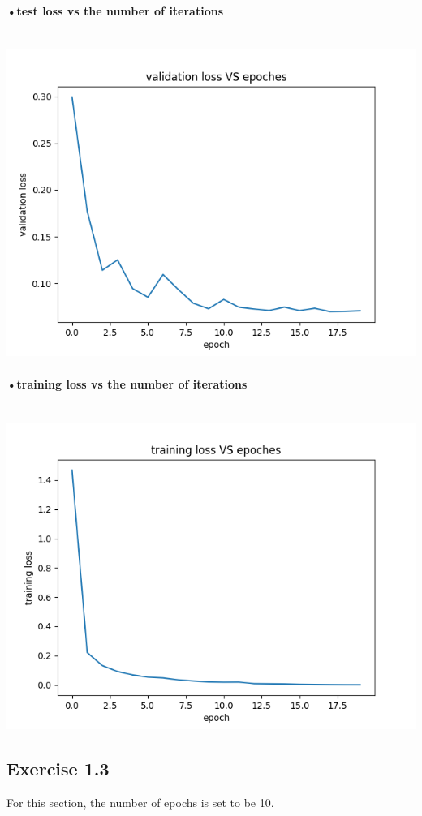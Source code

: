 \documentclass[11pt]{article} %
\begin{document}
\paragraph{•test loss vs the number of iterations}\mbox{}\\
\includegraphics[scale=0.5]{e123.png}
\paragraph{•training loss vs the number of iterations}\mbox{}\\
\includegraphics[scale=0.5]{e124.png}
\subsection{Exercise 1.3}
For this section, the number of epochs is set to be 10.
\end{document}
